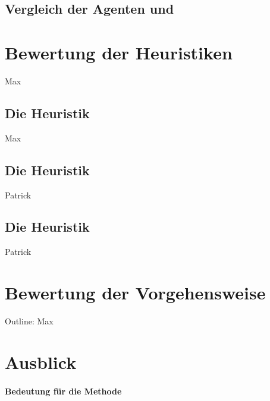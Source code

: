 \subsection{Vergleich der Agenten  und }
\label{subsec:Fazit:AgentenVgl}

\section{Bewertung der Heuristiken}
\label{sect:Fazit:Heuristiken}
Max
\subsection{Die Heuristik }
Max
\subsection{Die Heuristik }
Patrick
\subsection{Die Heuristik }
Patrick

\section{Bewertung der Vorgehensweise}
Outline: Max

\section{Ausblick}
\paragraph{Bedeutung für die Methode}

